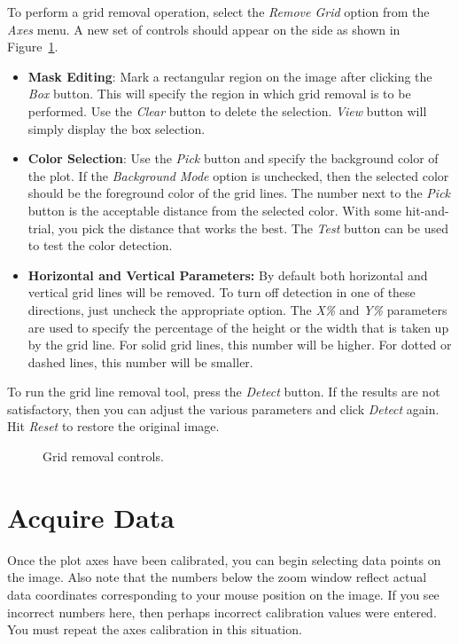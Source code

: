 \documentclass[letterpaper, 11pt]{article}
\begin{document}
To perform a grid removal operation, select the \emph{Remove Grid} option from the \emph{Axes} menu. A new set of controls should appear on the side as shown in Figure~\ref{fig:gridRemoval}.
\begin{itemize}
\item{{\bf Mask Editing}: Mark a rectangular region on the image after clicking the \emph{Box} button. This will specify the region in which grid removal is to be performed. Use the \emph{Clear} button to delete the selection. \emph{View} button will simply display the box selection.}
\item{{\bf Color Selection}: Use the \emph{Pick} button and specify the background color of the plot. If the \emph{Background Mode} option is unchecked, then the selected color should be the foreground color of the grid lines. The number next to the \emph{Pick} button is the acceptable distance from the selected color. With some hit-and-trial, you pick the distance that works the best. The \emph{Test} button can be used to test the color detection.}
\item{{\bf Horizontal and Vertical Parameters:} By default both horizontal and vertical grid lines will be removed. To turn off detection in one of these directions, just uncheck the appropriate option. The \emph{X\%} and \emph{Y\%} parameters are used to specify the percentage of the height or the width that is taken up by the grid line. For solid grid lines, this number will be higher. For dotted or dashed lines, this number will be smaller.}
\end{itemize}

To run the grid line removal tool, press the \emph{Detect} button. If the results are not satisfactory, then you can adjust the various parameters and click \emph{Detect} again. Hit \emph{Reset} to restore the original image.

\begin{figure}
\begin{center}
\caption{Grid removal controls.}
\label{fig:gridRemoval}
\end{center}
\end{figure}

\section{Acquire Data}

Once the plot axes have been calibrated, you can begin selecting data points on the image. Also note that the numbers below the zoom window reflect actual data coordinates corresponding to your mouse position on the image. If you see incorrect numbers here, then perhaps incorrect calibration values were entered. You must repeat the axes calibration in this situation. 
\end{document}
